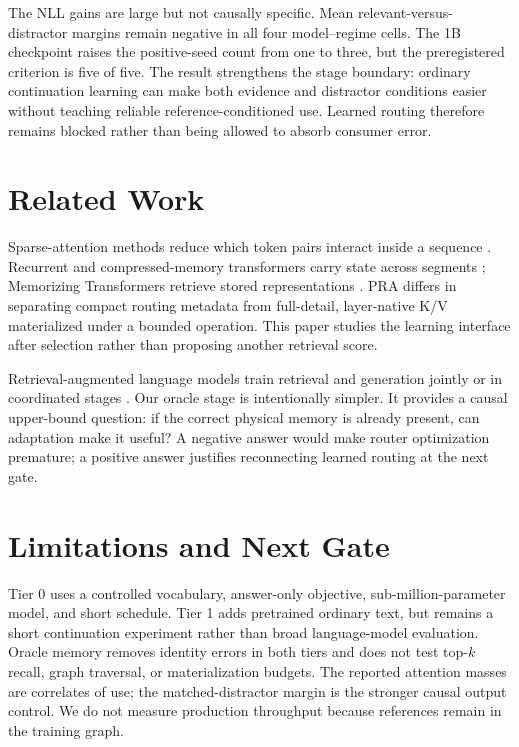\documentclass[11pt]{article}
\begin{document}
The NLL gains are large but not causally specific. Mean relevant-versus-
distractor margins remain negative in all four model--regime cells. The 1B
checkpoint raises the positive-seed count from one to three, but the
preregistered criterion is five of five. The result strengthens the stage
boundary: ordinary continuation learning can make both evidence and distractor
conditions easier without teaching reliable reference-conditioned use.
Learned routing therefore remains blocked rather than being allowed to absorb
consumer error.

\section{Related Work}

Sparse-attention methods reduce which token pairs interact inside a sequence
\cite{beltagy2020longformer,zaheer2020bigbird,roy2021routing}. Recurrent and
compressed-memory transformers carry state across segments
\cite{dai2019transformerxl,rae2020compressive}; Memorizing Transformers retrieve
stored representations \cite{wu2022memorizing}. PRA differs in separating compact
routing metadata from full-detail, layer-native K/V materialized under a bounded
operation. This paper studies the learning interface after selection rather than
proposing another retrieval score.

Retrieval-augmented language models train retrieval and generation jointly or in
coordinated stages \cite{guu2020realm,lewis2020rag,borgeaud2022retro}. Our oracle
stage is intentionally simpler. It provides a causal upper-bound question: if the
correct physical memory is already present, can adaptation make it useful? A
negative answer would make router optimization premature; a positive answer
justifies reconnecting learned routing at the next gate.

\section{Limitations and Next Gate}

Tier 0 uses a controlled vocabulary, answer-only objective, sub-million-parameter
model, and short schedule. Tier 1 adds pretrained ordinary text, but remains a
short continuation experiment rather than broad language-model evaluation.
Oracle memory removes identity errors in both tiers and does not test top-$k$
recall, graph traversal, or materialization budgets. The reported attention
masses are correlates of use; the matched-distractor margin is the stronger
causal output control. We do not measure production throughput because
references remain in the training graph.
\end{document}
